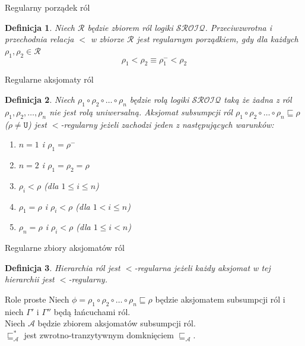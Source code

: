 \documentclass{beamer}
\newtheorem{definicja}{Definicja}
\begin{document}
\begin{frame}{Regularny porządek ról}
%
\begin{definicja}
Niech $\mathcal{R}$ będzie zbiorem ról logiki $\mathcal{SROIQ}$. Przeciwzwrotna i przechodnia relacja $<$ w zbiorze $\mathcal{R}$ jest \emph{regularnym porządkiem}, gdy dla każdych $\rho_1, \rho_2 \in \mathcal{R}$
$$\rho_{1} < \rho_{2} \equiv \rho_{1}^{-} < \rho_{2}$$
\end{definicja}
\end{frame}

\begin{frame}{Regularne aksjomaty ról}
%
\begin{definicja}
Niech $\rho_{1} \circ \rho_{2} \circ \dots \circ \rho_{n}$ będzie rolą logiki $\mathcal{SROIQ}$ taką że żadna z ról $\rho_{1}, \rho_{2}, \dots, \rho_{n}$ nie jest rolą uniwersalną.  
Aksjomat subsumpcji ról $\rho_{1} \circ \rho_{2} \circ \dots \circ \rho_{n} \sqsubseteq \rho$ ($\rho \neq \texttt{U}$) jest $<$-regularny jeżeli zachodzi jeden z następujących warunków:
\begin{enumerate}
\item $n=1$ i $\rho_{1} = \rho^{-}$
\item $n=2$ i $\rho_{1}=\rho_{2}=\rho$
\item $\rho_{i} < \rho$ (dla $1 \leq i \leq n$)
\item $\rho_{1}=\rho$ i $\rho_{i} < \rho$ (dla $1 < i \leq n$)
\item $\rho_{n}=\rho$ i $\rho_{i} < \rho$ (dla $1 \leq i < n$)
\end{enumerate}
\end{definicja}
\end{frame}

\begin{frame}{Regularne zbiory aksjomatów ról}
%
\begin{definicja}
Hierarchia ról jest $<$-regularna jeżeli każdy aksjomat w tej hierarchii jest $<$-regularny.
\end{definicja}
\end{frame}


\begin{frame}{Role proste}
%
Niech $\phi=\rho_{1} \circ \rho_{2} \circ \dots \circ \rho_{n} \sqsubseteq \rho$ będzie aksjomatem subsumpcji ról i niech $\Gamma'$ i $\Gamma''$ będą łańcuchami ról. %
%
\\
Niech $\mathcal{A}$ będzie zbiorem aksjomatów subsumpcji ról. %
%
\\
$\sqsubseteq_{\mathcal{A}}^{*}$ jest zwrotno-tranzytywnym domknięciem $\sqsubseteq_{\mathcal{A}}$.
\end{frame}
\end{document}
